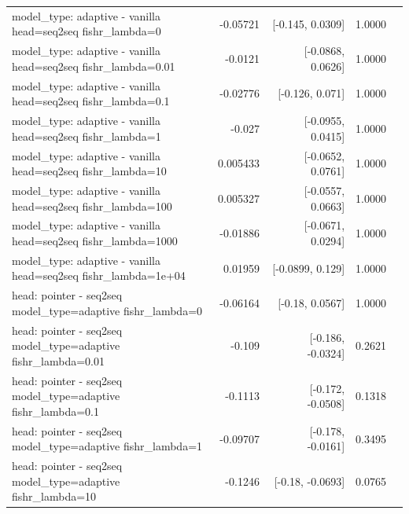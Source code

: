 \documentclass[10pt]{article}
\makeatletter
\newcommand{\stackcell}[1]{\begin{tabular}[t]{@{}l@{}}#1\end{tabular}}
\makeatother
\begin{document}
{\begin{longtable}{lrrrl}
\stackcell{model\_type: adaptive - vanilla\\\footnotesize head=seq2seq fishr\_lambda=0 } & -0.05721 & [-0.145, 0.0309] & 1.0000 & \\
\stackcell{model\_type: adaptive - vanilla\\\footnotesize head=seq2seq fishr\_lambda=0.01 } & -0.0121 & [-0.0868, 0.0626] & 1.0000 & \\
\stackcell{model\_type: adaptive - vanilla\\\footnotesize head=seq2seq fishr\_lambda=0.1 } & -0.02776 & [-0.126, 0.071] & 1.0000 & \\
\stackcell{model\_type: adaptive - vanilla\\\footnotesize head=seq2seq fishr\_lambda=1 } & -0.027 & [-0.0955, 0.0415] & 1.0000 & \\
\stackcell{model\_type: adaptive - vanilla\\\footnotesize head=seq2seq fishr\_lambda=10 } & 0.005433 & [-0.0652, 0.0761] & 1.0000 & \\
\stackcell{model\_type: adaptive - vanilla\\\footnotesize head=seq2seq fishr\_lambda=100 } & 0.005327 & [-0.0557, 0.0663] & 1.0000 & \\
\stackcell{model\_type: adaptive - vanilla\\\footnotesize head=seq2seq fishr\_lambda=1000 } & -0.01886 & [-0.0671, 0.0294] & 1.0000 & \\
\stackcell{model\_type: adaptive - vanilla\\\footnotesize head=seq2seq fishr\_lambda=1e+04 } & 0.01959 & [-0.0899, 0.129] & 1.0000 & \\
\stackcell{head: pointer - seq2seq\\\footnotesize model\_type=adaptive fishr\_lambda=0 } & -0.06164 & [-0.18, 0.0567] & 1.0000 & \\
\stackcell{head: pointer - seq2seq\\\footnotesize model\_type=adaptive fishr\_lambda=0.01 } & -0.109 & [-0.186, -0.0324] & 0.2621 & \\
\stackcell{head: pointer - seq2seq\\\footnotesize model\_type=adaptive fishr\_lambda=0.1 } & -0.1113 & [-0.172, -0.0508] & 0.1318 & \\
\stackcell{head: pointer - seq2seq\\\footnotesize model\_type=adaptive fishr\_lambda=1 } & -0.09707 & [-0.178, -0.0161] & 0.3495 & \\
\stackcell{head: pointer - seq2seq\\\footnotesize model\_type=adaptive fishr\_lambda=10 } & -0.1246 & [-0.18, -0.0693] & 0.0765 & \\

\end{longtable}}
\end{document}
